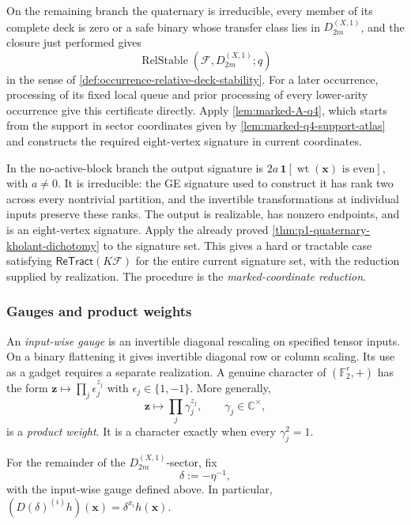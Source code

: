 \documentclass[11pt,letterpaper,onecolumn]{article}
\theoremstyle{plain}
\theoremstyle{definition}
\theoremstyle{remark}
\newcommand{\Ftwo}{\mathbb F_2}
\newcommand{\cF}{\mathcal F}
\newcommand{\ReTract}{\mathsf{ReTract}}
\newcommand{\DihXone}[1]{{D_{#1}^{(X,1)}}}
\newcommand{\wt}{\operatorname{wt}}
\newcommand{\one}{\mathbf 1}
\begin{document}
On the remaining branch the quaternary is irreducible, every member of its complete deck
is zero or a safe binary whose transfer class lies in \(\DihXone{2m}\), and the closure just performed gives
\[
 \operatorname{RelStable}(\cF,\DihXone{2m};q)
\]
in the sense of \cref{def:occurrence-relative-deck-stability}.  For a later
occurrence, processing of its fixed local queue and prior processing of every
lower-arity occurrence give this certificate directly.  Apply \cref{lem:marked-A-q4}, which starts from the support in sector
coordinates given by \cref{lem:marked-q4-support-atlas} and constructs
the required eight-vertex signature in current coordinates.

In the no-active-block branch the output signature is
\(2a\,\one[\wt({\mathbf{x}})\text{ is even}]\), with \(a\ne0\).
It is irreducible: the GE signature used to construct
it has rank two across every nontrivial partition, and the invertible
transformations at individual inputs preserve these ranks.  The output is realizable,
has nonzero endpoints, and is an eight-vertex signature.  Apply the already
proved \cref{thm:p1-quaternary-kholant-dichotomy} to the signature set. This gives a hard or tractable case satisfying \(\ReTract(K\cF)\) for the
entire current signature set, with the reduction supplied by realization. The procedure is the
\emph{marked-coordinate reduction}.
\label{par:marked-coordinate-reduction}

\subsubsection{Gauges and product weights}
\label{subsubsec:gauge-product-weights}

An \emph{input-wise gauge} is an invertible diagonal rescaling on specified
tensor inputs. On a binary flattening it gives invertible diagonal row or
column scaling.  Its use as a gadget requires a separate realization.  A genuine character of
\((\Ftwo^r,+)\) has the form
\({\mathbf z}\mapsto\prod_j\epsilon_j^{z_j}\) with
\(\epsilon_j\in\{1,-1\}\).  More generally,
\[
 {\mathbf z}\longmapsto\prod_j\gamma_j^{z_j},
 \qquad \gamma_j\in\mathbb C^\times,
\]
is a \emph{product weight}. It is a
character exactly when every \(\gamma_j^2=1\).

For the remainder of the \(\DihXone{2m}\)-sector, fix
\[
 \delta:=-\eta^{-1},
\]
with the input-wise gauge defined above. In particular,
\((D(\delta)^{(i)}h)({\mathbf{x}})=\delta^{x_i}h({\mathbf{x}})\).
\end{document}
